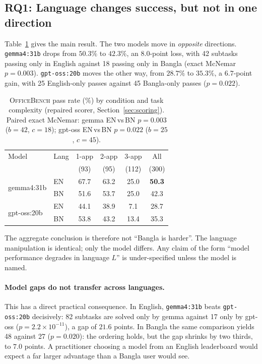 \documentclass[11pt]{article}
\newcommand{\dn}[1]{\textcolor{red!70!black}{#1}}
\newcommand{\up}[1]{\textcolor{green!45!black}{#1}}
\begin{document}
\subsection{RQ1: Language changes success, but not in one direction}

Table~\ref{tab:main} gives the main result. The two models move in \emph{opposite} directions.
\texttt{gemma4:31b} drops from $50.3\%$ to $42.3\%$, an $8.0$-point loss, with 42 subtasks
passing only in English against 18 passing only in Bangla (exact McNemar $p=0.003$).
\texttt{gpt-oss:20b} moves the other way, from $28.7\%$ to $35.3\%$, a $6.7$-point gain, with 25
English-only passes against 45 Bangla-only passes ($p=0.022$).

\begin{table}[t]
\centering\small
\begin{tabular}{llcccc}
\toprule
Model & Lang & 1-app & 2-app & 3-app & All \\
 & & (93) & (95) & (112) & (300) \\
\midrule
\multirow{2}{*}{gemma4:31b}
 & EN & 67.7 & 63.2 & 25.0 & \textbf{50.3} \\
 & BN & 51.6 & 53.7 & 25.0 & \dn{42.3} \\
\midrule
\multirow{2}{*}{gpt-oss:20b}
 & EN & 44.1 & 38.9 & 7.1 & 28.7 \\
 & BN & 53.8 & 43.2 & 13.4 & \up{35.3} \\
\bottomrule
\end{tabular}
\caption{\textsc{OfficeBench} pass rate (\%) by condition and task complexity (repaired
scorer, Section~\ref{sec:scoring}). Paired exact McNemar:
gemma EN\,vs\,BN $p=0.003$ ($b{=}42$, $c{=}18$);
gpt-oss EN\,vs\,BN $p=0.022$ ($b{=}25$, $c{=}45$).}
\label{tab:main}
\end{table}

The aggregate conclusion is therefore not ``Bangla is harder''. The language manipulation is
identical; only the model differs. Any claim of the form ``model performance degrades in
language $L$'' is under-specified unless the model is named.

\paragraph{Model gaps do not transfer across languages.}
This has a direct practical consequence. In English, \texttt{gemma4:31b}
beats \texttt{gpt-oss:20b} decisively: 82 subtasks are solved only by gemma against 17 only by
gpt-oss ($p=2.2\times10^{-11}$), a gap of $21.6$ points. In Bangla the same comparison yields 48
against 27 ($p=0.020$): the ordering holds, but the gap shrinks by two thirds, to $7.0$ points.
A practitioner choosing a model from an English leaderboard would expect a far larger advantage
than a Bangla user would see.
\end{document}
